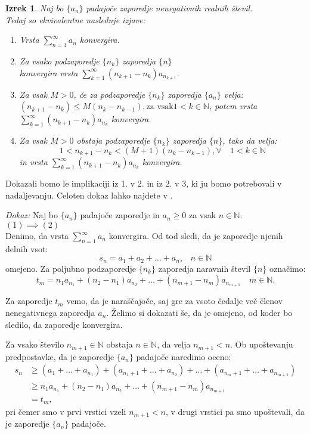 \documentclass[a4paper,12pt]{article}
\def\N{\mathbb{N}} %
\newtheorem{izrek}{Izrek}
\begin{document}
\begin{izrek}
    Naj bo $\{a_n\}$ padajoče zaporedje nenegativnih realnih števil. \\
    
    Tedaj so ekvivalentne naslednje izjave:
    \begin{enumerate}
        \item Vrsta $\sum_{n = 1}^{\infty}{a_n}$ konvergira.
        \item Za vsako podzaporedje $\{n_k\}$ zaporedja $\{n\}$ \\
        konvergira vrsta $\sum_{k = 1}^{\infty}{(n_{k+1} - n_k)a_{n_{k + 1}}}$.
        \item Za vsak $M > 0$, če za podzaporedje $\{n_k\}$ zaporedja $\{a_n\}$ velja:\\
        $ (n_{k+1} - n_k) \leq M(n_k - n_{k - 1}),  \text{za vsak} 1 < k \in \N$,
        potem vrsta $\sum_{k = 1}^{\infty}{(n_{k+1} - n_k)a_{n_{k}}}$ konvergira.
        \item Za vsak $M > 0$ obstaja podzaporedje $\{n_k\}$ zaporedja $\{n\}$, tako da velja:
        \[
            1 < n_{k+1} - n_k < (M+1)(n_k - n_{k - 1}),  \forall \quad 1 < k \in \N 
        \]
        in vrsta $\sum_{k = 1}^{\infty}{(n_{k+1} - n_k)a_{n_{k}}}$ konvergira.
    \end{enumerate}
\end{izrek}

\noindent
Dokazali bomo le implikaciji iz 1. v 2. in iz 2. v 3, ki ju bomo potrebovali v nadaljevanju. Celoten dokaz lahko najdete v \cite{convergence}.

\noindent
{\em Dokaz:\/}
Naj bo $\{a_n\}$ padajoče zaporedje in $a_n \geq 0$ za vsak $n \in \N$.\\
$(1) \implies (2)$\\
Denimo, da vrsta $\sum_{n = 1}^{\infty}{a_n}$ konvergira. Od tod sledi, da je zaporedje njenih delnih vsot:
\[
  s_n = a_1 + a_2 + \ldots + a_n \text{,}\quad  n \in \N
\] omejeno.
Za poljubno podzaporedje $\{n_k\}$ zaporedja naravnih števil $\{n\}$ označimo:
\[
  t_m =  n_1a_{n_1} + (n_2 - n_1)a_{n_2} + \ldots + (n_{m + 1} - n_{m})a_{n_{m+ 1}} \quad m \in \N \text{.}
\]

Za zaporedje $t_m$ vemo, da je naraščajoče, saj gre za vsoto čedalje več členov nenegativnega zaporedja $a_n$.
Želimo si dokazati še, da je omejeno, od koder bo sledilo, da zaporedje konvergira.  

Za vsako število $n_{m + 1} \in \N$ obstaja $n \in \N$, da velja $n_{m + 1} < n$.
Ob upoštevanju predpostavke, da je zaporedje $\{a_n\}$ padajoče naredimo oceno:
\[
    \begin{split}
        s_n & \geq (a_1 + \ldots + a_{n_1}) + (a_{n_{1} + 1} + \ldots + a_{n_2}) + \ldots + (a_{n_{m} + 1} + \ldots + a_{n_{m+1}})\\
        & \geq n_1a_{n_1} + (n_2 - n_1)a_{n_2} + \ldots + (n_{m + 1} - n_{m})a_{n_{m+ 1}}\\
        & = t_m \text{,}
    \end{split}
\]
pri čemer smo v prvi vrstici vzeli $n_{m + 1} < n$, v drugi vrstici pa smo upoštevali, da je zaporedje $\{a_n\}$ padajoče.
\end{document}

